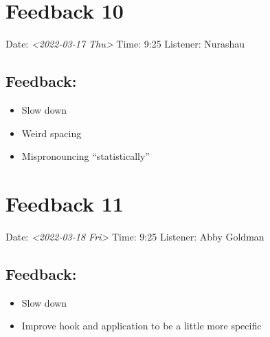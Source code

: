 \documentclass[little]{basic}
\begin{document}
\section{Feedback 10}
\label{sec:orgfe25489}
Date: \textit{<2022-03-17 Thu>}
Time: 9:25
Listener: Nurashau
\subsection*{Feedback:}
\label{sec:org28862e7}
\begin{itemize}
\item Slow down
\item Weird spacing
\item Mispronouncing ``statistically''
\end{itemize}

\section{Feedback 11}
\label{sec:org0efdbe0}
Date: \textit{<2022-03-18 Fri>}
Time: 9:25
Listener: Abby Goldman
\subsection*{Feedback:}
\label{sec:orgf9a6d41}
\begin{itemize}
\item Slow down
\item Improve hook and application to be a little more specific
\end{itemize}
\end{document}
